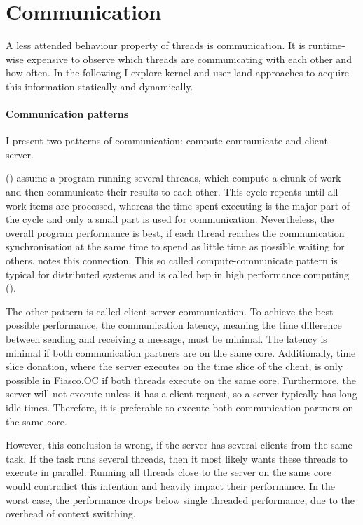 \section{Communication}
\label{design:comm}


A less attended behaviour property of threads is communication.
It is runtime-wise expensive to observe which threads are communicating with
each other and how often.
In the following I explore kernel and user-land approaches to acquire this
information statically and dynamically.


\paragraph{Communication patterns}
I present two patterns of communication: compute-communicate and client-server.

\citeauthor{hofmeyr_load_2010} (\cite{hofmeyr_load_2010}) assume a program running several threads, which
compute a chunk of work and then communicate their results to each other.
This cycle repeats until all work items are processed, whereas the time spent executing
is the major part of the cycle and only a small part is used for communication.
Nevertheless, the overall program performance is best, if each thread reaches
the communication synchronisation at the same time to spend as little time as
possible waiting for others.
\cite{hofmeyr_load_2010} notes this connection.
This so called compute-communicate pattern is typical for distributed systems and is
called \gls{bsp} in high performance computing (\cite{mccoll_scalability_1996}).

The other pattern is called client-server communication.
To achieve the best possible performance, the communication latency, meaning
the time difference between sending and receiving a message, must be minimal.
The latency is minimal if both communication partners are on the same core.
Additionally, time slice donation, where the server executes on the time slice
of the client, is only possible in Fiasco.OC if both threads execute on the same core.
Furthermore, the server will not execute unless it has a client request, so a
server typically has long idle times.
Therefore, it is preferable to execute both communication partners on the same
core.

However, this conclusion is wrong, if the server has several clients from the
same task.
If the task runs several threads, then it most likely wants these threads to
execute in parallel.
Running all threads close to the server on the same core would contradict this
intention and heavily impact their performance.
In the worst case, the performance drops below single threaded performance, due
to the overhead of context switching.

